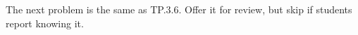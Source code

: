 \documentclass[handout]{mcs}
\begin{document}



\begin{staffnotes}
The next problem is the same as TP.3.6.  Offer it for review, but skip
if students report knowing it.
\end{staffnotes}



\end{document}
